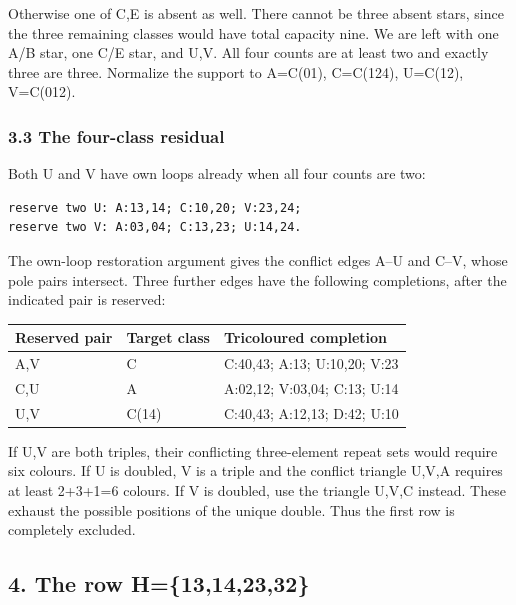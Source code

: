 \documentclass[
  10pt,
]{article}
\begin{document}
Otherwise one of C,E is absent as well. There cannot be three absent
stars, since the three remaining classes would have total capacity nine.
We are left with one A/B star, one C/E star, and U,V. All four counts
are at least two and exactly three are three. Normalize the support to
A=C(01), C=C(124), U=C(12), V=C(012).

\hypertarget{the-four-class-residual}{%
\subsubsection*{3.3 The four-class
residual}\label{the-four-class-residual}}

Both U and V have own loops already when all four counts are two:

\begin{verbatim}
reserve two U: A:13,14; C:10,20; V:23,24;
reserve two V: A:03,04; C:13,23; U:14,24.
\end{verbatim}

The own-loop restoration argument gives the conflict edges A--U and
C--V, whose pole pairs intersect. Three further edges have the following
completions, after the indicated pair is reserved:

\begin{longtable}[]{@{}lll@{}}
\toprule\noalign{}
Reserved pair & Target class & Tricoloured completion \\
\midrule\noalign{}
\endhead
\bottomrule\noalign{}
\endlastfoot
A,V & C & C:40,43; A:13; U:10,20; V:23 \\
C,U & A & A:02,12; V:03,04; C:13; U:14 \\
U,V & C(14) & C:40,43; A:12,13; D:42; U:10 \\
\end{longtable}

If U,V are both triples, their conflicting three-element repeat sets
would require six colours. If U is doubled, V is a triple and the
conflict triangle U,V,A requires at least 2+3+1=6 colours. If V is
doubled, use the triangle U,V,C instead. These exhaust the possible
positions of the unique double. Thus the first row is completely
excluded.

\hypertarget{the-row-h13142332}{%
\subsection*{4. The row H=\{13,14,23,32\}}\label{the-row-h13142332}}
\end{document}
